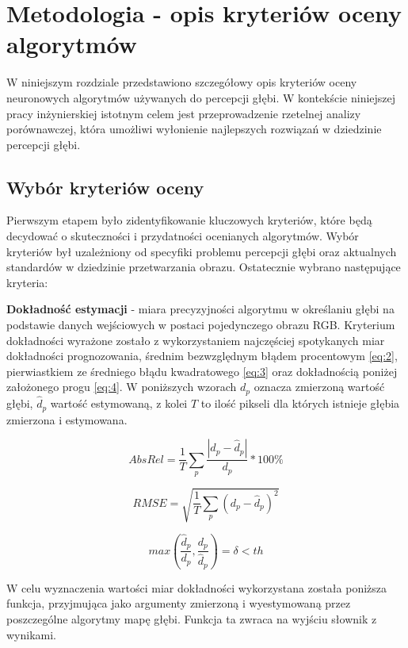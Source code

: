 \chapter{Metodologia - opis kryteriów oceny algorytmów}\label{chap:metodologia}

W niniejszym rozdziale przedstawiono szczegółowy opis kryteriów oceny neuronowych algorytmów używanych do percepcji głębi. W kontekście niniejszej pracy inżynierskiej istotnym celem jest przeprowadzenie rzetelnej analizy porównawczej, która umożliwi wyłonienie najlepszych rozwiązań w dziedzinie percepcji głębi.

\section{Wybór kryteriów oceny}
Pierwszym etapem było zidentyfikowanie kluczowych kryteriów, które będą decydować o skuteczności i przydatności ocenianych algorytmów. Wybór kryteriów był uzależniony od specyfiki problemu percepcji głębi oraz aktualnych standardów w dziedzinie przetwarzania obrazu. Ostatecznie wybrano następujące kryteria:

\textbf{Dokładność estymacji} - miara precyzyjności algorytmu w określaniu głębi na podstawie danych wejściowych w postaci pojedynczego obrazu RGB. Kryterium dokładności wyrażone zostało z wykorzystaniem najczęściej spotykanych miar dokładności prognozowania, średnim bezwzględnym błądem procentowym \ref{eq:2}, pierwiastkiem ze średniego błądu kwadratowego \ref{eq:3} oraz dokładnością poniżej założonego progu \ref{eq:4}. W poniższych wzorach $ d_p $ oznacza zmierzoną wartość głębi, $ \hat{d}_p $ wartość estymowaną, z kolei $ T $ to ilość pikseli dla których istnieje głębia zmierzona i estymowana.

\begin{equation} \label{eq:2}
    AbsRel = \frac{1}{T} \sum_{p} \frac{|d_p - \hat{d}_p|}{d_p} * 100\%
\end{equation}

\begin{equation} \label{eq:3}
    RMSE = \sqrt{\frac{1}{T} \sum_{p} (d_p - \hat{d}_p)^2}
\end{equation}

\begin{equation} \label{eq:4}
    max(\frac{\hat{d}_p}{d_p}, \frac{d_p}{\hat{d}_p}) = \delta < th
\end{equation}

W celu wyznaczenia wartości miar dokładności wykorzystana została poniższa funkcja, przyjmująca jako argumenty zmierzoną i wyestymowaną przez poszczególne algorytmy mapę głębi. Funkcja ta zwraca na wyjściu słownik z wynikami.

